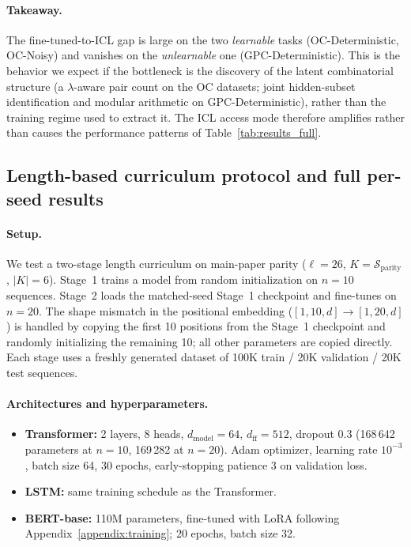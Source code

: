 \documentclass[fullpaper]{nldl}
\theoremstyle{plain}
\theoremstyle{definition}
\theoremstyle{remark}
\begin{document}
\paragraph{Takeaway.}
The fine-tuned-to-ICL gap is large on the two \emph{learnable} tasks (OC-Deterministic, OC-Noisy) and vanishes on the \emph{unlearnable} one (GPC-Deterministic). This is the behavior we expect if the bottleneck is the discovery of the latent combinatorial structure (a $\lambda$-aware pair count on the OC datasets; joint hidden-subset identification and modular arithmetic on GPC-Deterministic), rather than the training regime used to extract it. The ICL access mode therefore amplifies rather than causes the performance patterns of Table~\ref{tab:results_full}.

\subsection{Length-based curriculum protocol and full per-seed results}
\label{app:parity_curriculum}

\paragraph{Setup.} We test a two-stage length curriculum on main-paper parity ($\ell=26$, $K=\mathcal{S}_{\text{parity}}$, $|K|=6$). Stage~1 trains a model from random initialization on $n=10$ sequences. Stage~2 loads the matched-seed Stage~1 checkpoint and fine-tunes on $n=20$. The shape mismatch in the positional embedding ($[1, 10, d] \to [1, 20, d]$) is handled by copying the first 10 positions from the Stage~1 checkpoint and randomly initializing the remaining 10; all other parameters are copied directly. Each stage uses a freshly generated dataset of 100K train / 20K validation / 20K test sequences.

\paragraph{Architectures and hyperparameters.}
\begin{itemize}
\item \textbf{Transformer:} 2 layers, 8 heads, $d_{\text{model}}=64$, $d_{\text{ff}}=512$, dropout 0.3 (168\,642 parameters at $n=10$, 169\,282 at $n=20$). Adam optimizer, learning rate $10^{-3}$, batch size 64, 30 epochs, early-stopping patience 3 on validation loss.
\item \textbf{LSTM:} same training schedule as the Transformer.
\item \textbf{BERT-base:} 110M parameters, fine-tuned with LoRA following Appendix~\ref{appendix:training}; 20 epochs, batch size 32.
\end{itemize}
\end{document}
